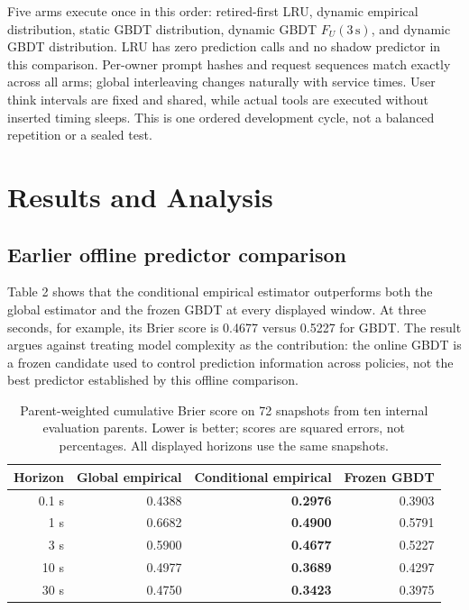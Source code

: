 \documentclass[sigconf, screen, review]{acmart}
\def\endhead{}
\def\endlastfoot{}
\begin{document}
Five arms execute once in this order: retired-first LRU, dynamic
empirical distribution, static GBDT distribution, dynamic GBDT
\(F_U(3\,\mathrm{s})\), and dynamic GBDT distribution. LRU has zero
prediction calls and no shadow predictor in this comparison. Per-owner
prompt hashes and request sequences match exactly across all arms;
global interleaving changes naturally with service times. User think
intervals are fixed and shared, while actual tools are executed without
inserted timing sleeps. This is one ordered development cycle, not a
balanced repetition or a sealed test.


\section{Results and Analysis}\label{results-and-analysis}

\subsection{Earlier offline predictor comparison}\label{conditional-empirical-prediction-is-stronger-on-current-data}

Table 2 shows that the conditional empirical estimator outperforms both
the global estimator and the frozen GBDT at every displayed window. At
three seconds, for example, its Brier score is 0.4677 versus 0.5227 for
GBDT. The result argues against treating model complexity as the
contribution: the online GBDT is a frozen candidate used to control
prediction information across policies, not the best predictor
established by this offline comparison.

\begin{table}[t]
\centering\small
\begin{tabular}{@{}rrrr@{}}
\toprule\noalign{}
Horizon & Global empirical & Conditional empirical & Frozen GBDT \\
\midrule\noalign{}
\endhead
\bottomrule\noalign{}
\endlastfoot
0.1 s & 0.4388 & \textbf{0.2976} & 0.3903 \\
1 s & 0.6682 & \textbf{0.4900} & 0.5791 \\
3 s & 0.5900 & \textbf{0.4677} & 0.5227 \\
10 s & 0.4977 & \textbf{0.3689} & 0.4297 \\
30 s & 0.4750 & \textbf{0.3423} & 0.3975 \\
\end{tabular}
\caption{Parent-weighted cumulative Brier score on 72 snapshots from ten internal evaluation parents. Lower is better; scores are squared errors, not percentages. All displayed horizons use the same snapshots.}
\end{table}
\end{document}
